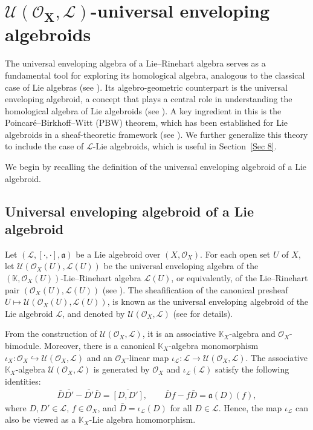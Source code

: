 \documentclass[pdftex]{sigma}
\numberwithin{equation}{section}
\theoremstyle{definition}
\begin{document}
\section[U(O\_X,L)-universal enveloping algebroids]{$\boldsymbol{\mathcal{U}(\mathcal{O}_X, \mathcal{L})}$-universal enveloping algebroids} \label{Sec 7}

The universal enveloping algebra of a Lie--Rinehart algebra serves as a fundamental tool for exploring its homological algebra, analogous to the classical case of Lie algebras (see \cite{ JH, JH1, HOM, GR}). Its algebro-geometric counterpart is the universal enveloping algebroid, a concept that plays a central role in understanding the homological algebra of Lie algebroids (see \cite{UB, BRT, CV,MK, AA, BP}). A key ingredient in this is the Poincar\'e--Birkhoff--Witt (PBW) theorem, which has been established for Lie algebroids in a sheaf-theoretic framework (see \cite{AA}). We further generalize this theory to include the case of $\mathcal{L}$-Lie algebroids, which is useful in Section~\ref{Sec 8}.

We begin by recalling the definition of the universal enveloping algebroid of a Lie algebroid.

	\subsection{Universal enveloping algebroid of a Lie algebroid}
Let $(\mathcal{L},[\cdot,\cdot],\mathfrak{a})$ be a Lie algebroid over $(X, \mathcal{O}_X)$. For each open set $U$ of $X$, let $\mathcal{U}(\mathcal{O}_X(U),\mathcal{L}(U))$ be the universal enveloping algebra of the $(\mathbb{K},\mathcal{O}_X(U))$-Lie--Rinehart algebra $\mathcal{L}(U)$, or equivalently, of the Lie--Rinehart pair $(\mathcal{O}_X(U),\mathcal{L}(U))$ (see \cite{JH,MM, GR}). The sheafification of the canonical presheaf
$U \mapsto \mathcal{U}(\mathcal{O}_X(U),\mathcal{L}(U))$, is known as the universal enveloping algebroid of the Lie algebroid $\mathcal{L}$, and denoted by $\mathcal{U}(\mathcal{O}_X, \mathcal{L})$ (see \cite{UB,DRV,AA,BP,TS} for details).

	From the construction of $\mathcal{U}(\mathcal{O}_X, \mathcal{L})$, it is an associative $\mathbb{K}_X$-algebra and $\mathcal{O}_X$-bimodule. Moreover,
there is a canonical $\mathbb{K}_X$-algebra monomorphism $\iota_X\colon \mathcal{O}_X \hookrightarrow \mathcal{U}(\mathcal{O}_X,\mathcal{L})$ and an $\mathcal{O}_X$-linear map $\iota_{\mathcal{L}}\colon \mathcal{L} \rightarrow \mathcal{U}(\mathcal{O}_X,\mathcal{L})$.
The associative $\mathbb{K}_X$-algebra $\mathcal{U}(\mathcal{O}_X, \mathcal{L})$ is generated by $\mathcal{O}_X$ and $\iota_{\mathcal{L}}(\mathcal{L})$ satisfy the following identities:
\begin{align} \label{identities}
	\bar{D} \bar{D'} - \bar{D'} \bar{D}= \overline{[D, D']}, \qquad \bar{D} f - f \bar{D}= \mathfrak{a}(D)(f),
\end{align}
where $D, D' \in \mathcal{L}$, $f \in \mathcal{O}_X$, and $\bar{D}= \iota_{\mathcal{L}}(D)$ for all $D\in \mathcal{L}$.
Hence, the map $\iota_{\mathcal{L}}$ can also be viewed as a $\mathbb{K}_X$-Lie algebra homomorphism.
\end{document}
